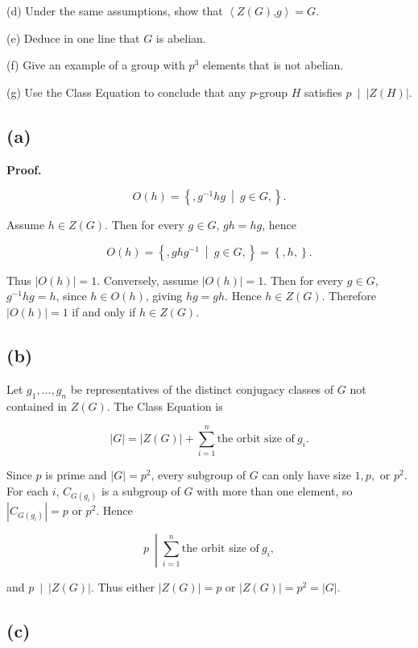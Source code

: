 (d) Under the same assumptions, show that \(\left\langle {Z(G)\text{,}g} \right\rangle = G\).

(e) Deduce in one line that \(G\) is abelian.

(f) Give an example of a group with \(p^{3}\) elements that is not abelian.

(g) Use the Class Equation to conclude that any \(p\)-group \(H\) satisfies \(\left. p\  \middle| \ \left| {Z(H)} \right| \right.\).

\subsection{(a)}

\textbf{Proof.}

\[O(h) = \left\{ ,g^{- 1}hg\  \middle| \ g \in G, \right\}.\]

Assume \(h \in Z(G)\). Then for every \(g \in G\), \(gh = hg\), hence

\[O(h) = \left\{ ,ghg^{- 1}\  \middle| \ g \in G, \right\} = \left\{ {,h,} \right\}.\]

Thus \(\left| {O(h)} \right| = 1\). Conversely, assume \(\left| {O(h)} \right| = 1\). Then for every \(g \in G\), \(g^{- 1}hg = h\), since \(h \in O(h)\), giving \(hg = gh\). Hence \(h \in Z(G)\). Therefore \(\left| {O(h)} \right| = 1\) if and only if \(h \in Z(G)\).

\subsection{(b)}

Let \(g_{1},\ldots,g_{n}\) be representatives of the distinct conjugacy classes of \(G\) not contained in \(Z(G)\). The Class Equation is

\[|G| = \left| {Z(G)} \right| + \sum\limits_{i = 1}^{n}\text{the orbit size of}\ g_{i}.\]

Since \(p\) is prime and \(|G| = p^{2}\), every subgroup of \(G\) can only have size \(1,p,\) or \(p^{2}\). For each \(i\), \(C_{G{(g_{i})}}\) is a subgroup of \(G\) with more than one element, so \(\left| C_{G{(g_{i})}} \right| = p\) or \(p^{2}\). Hence

\[\left. p\  \middle| \sum\limits_{i = 1}^{n}\text{the orbit size of}\ g_{i}, \right.\]

and \(\left. p\  \middle| \ \left| {Z(G)} \right| \right.\). Thus either \(\left| {Z(G)} \right| = p\) or \(\left| {Z(G)} \right| = p^{2} = |G|\).

\subsection{(c)}

